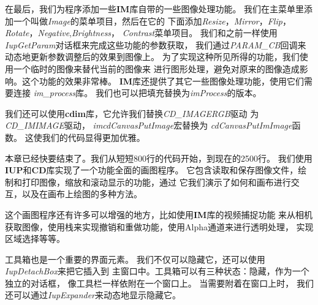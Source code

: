 \documentclass{ctexart}
\begin{document}
在最后，我们为程序添加一些\textbf{IM}库自带的一些图像处理功能。
我们在主菜单里添加一个叫做\emph{Image}的菜单项目，然后在它的
下面添加\emph{Resize}，\emph{Mirror}，\emph{Flip}，
\emph{Rotate}，\emph{Negative},\emph{Brightness}，
\emph{Contrast}菜单项目。
我们和之前一样使用\emph{IupGetParam}对话框来完成这些功能的参数获取，
我们通过\emph{PARAM\_CB}回调来动态地更新参数调整后的效果到图像上。
为了实现这种所见所得的功能，我们使用一个临时的图像来替代当前的图像来
进行图形处理，避免对原来的图像造成影响。这个功能的效果非常棒。
\textbf{IM}库还提供了其它一些图像处理功能，使用它们需要连接
\emph{im\_process}库。
我们也可以把填充替换为\emph{imProcess}的版本。

我们还可以使用\textbf{cdim}库，它允许我们替换\emph{CD\_IMAGERGB}驱动
为\emph{CD\_IMIMAGE}驱动，
\emph{imcdCanvasPutImage}宏替换为
\emph{cdCanvasPutImImage}函数。
这使我们的代码显得更加优雅。

本章已经快要结束了。我们从短短800行的代码开始，到现在的2500行。
我们使用\textbf{IUP}和\textbf{CD}库实现了一个功能全面的画图程序。
它包含读取和保存图像文件，绘制和打印图像，缩放和滚动显示的功能，通过
它我们演示了如何和画布进行交互，以及在画布上绘图的多种方法。

这个画图程序还有许多可以增强的地方，比如使用\textbf{IM}库的视频捕捉功能
来从相机获取图像，使用栈来实现撤销和重做功能，使用Alpha通道来进行透明处理，
实现区域选择等等。

工具箱也是一个重要的界面元素。
我们不仅可以隐藏它，还可以使用\emph{IupDetachBox}来把它插入到
主窗口中。工具箱可以有三种状态：隐藏，作为一个独立的对话框，
像工具栏一样依附在一个窗口上。
当需要附着在窗口上时，
我们还可以通过\emph{IupExpander}来动态地显示隐藏它。
\end{document}
